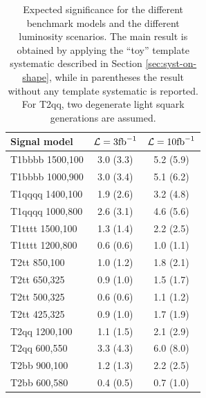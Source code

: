 \begin{table}
  \centering
  \caption{Expected significance for the different benchmark models and the different luminosity scenarios. 
    The main result is obtained by applying 
  the ``toy'' template systematic described in Section \ref{sec:syst-on-shape},
while in parentheses the result without any template systematic is reported. 
For T2qq, two degenerate light squark generations are assumed.}

  \label{tab:results_signif}
  \footnotesize
  \footnotesize
  \begin{tabular}{lcc}
    \hline
    \hline
    Signal model & $\mathcal{L} = 3 \text{fb}^{-1}$ & $\mathcal{L} = 10 \text{fb}^{-1}$ \\
    \hline
    \hline
    T1bbbb 1500,100  & 3.0 (3.3) & 5.2 (5.9) \\  
    T1bbbb 1000,900  & 3.0 (3.4) & 5.1 (6.2) \\  
    T1qqqq 1400,100  & 1.9 (2.6) & 3.2 (4.8) \\  
    T1qqqq 1000,800  & 2.6 (3.1) & 4.6 (5.6) \\  
    T1tttt 1500,100  & 1.3 (1.4) & 2.2 (2.5) \\  
    T1tttt 1200,800  & 0.6 (0.6) & 1.0 (1.1) \\  \hline
    T2tt 850,100     & 1.0 (1.2) & 1.8 (2.1) \\  
    T2tt 650,325     & 0.9 (1.0) & 1.5 (1.7) \\  
    T2tt 500,325     & 0.6 (0.6) & 1.1 (1.2) \\  
    T2tt 425,325     & 0.9 (1.0) & 1.7 (1.9) \\  
    T2qq 1200,100    & 1.1 (1.5) & 2.1 (2.9) \\  
    T2qq 600,550     & 3.3 (4.3) & 6.0 (8.0) \\  
    T2bb 900,100     & 1.2 (1.3) & 2.2 (2.5) \\
    T2bb 600,580     & 0.4 (0.5) & 0.7 (1.0) \\  
    \hline
    \hline
  \end{tabular} 
\end{table}


